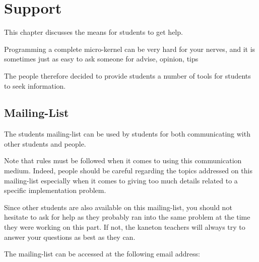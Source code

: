 %
%
%
%
%
%

%
%

\chapter{Support}
\label{chapter:support}

This chapter discusses the means for students to get help.

\newpage

%
%

Programming a complete micro-kernel can be very hard for your nerves, and
it is sometimes just as easy to ask someone for advise, opinion, tips \etc{}

The  people therefore decided to provide students a number of
tools for students to seek information.

%
%

\section{Mailing-List}

The students mailing-list can be used by students for both communicating with
other students and  people.

Note that rules must be followed when it comes to using this communication
medium. Indeed, people should be careful regarding the topics addressed
on this mailing-list especially when it comes to giving too much details
related to a specific implementation problem.

Since other students are also available on this mailing-list, you should not
hesitate to ask for help as they probably ran into the same problem at the
time they were working on this part. If not, the kaneton teachers will always
try to answer your questions as best as they can.

The mailing-list can be accessed at the following email address:

\begin{center}
\end{center}

